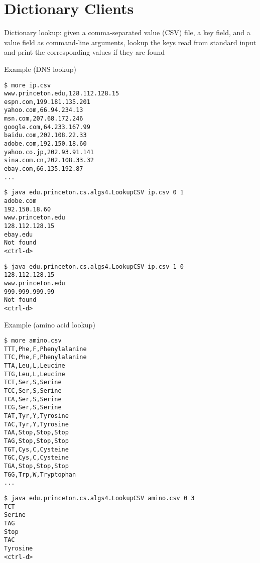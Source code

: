 \documentclass[8pt,a4paper,compress]{beamer}
\begin{document}
\section{Dictionary Clients}
\begin{frame}[fragile]
Dictionary lookup: given a comma-separated value (CSV) file, a key field, and a value field as command-line arguments, lookup the keys read from standard input and print the corresponding values if they are found

\bigskip

Example (DNS lookup)
\begin{lstlisting}[language={}]
$ more ip.csv
www.princeton.edu,128.112.128.15
espn.com,199.181.135.201
yahoo.com,66.94.234.13
msn.com,207.68.172.246
google.com,64.233.167.99
baidu.com,202.108.22.33
adobe.com,192.150.18.60
yahoo.co.jp,202.93.91.141
sina.com.cn,202.108.33.32
ebay.com,66.135.192.87
...
\end{lstlisting}
\begin{lstlisting}[language={}]
$ java edu.princeton.cs.algs4.LookupCSV ip.csv 0 1
adobe.com
192.150.18.60
www.princeton.edu
128.112.128.15
ebay.edu
Not found 
<ctrl-d>
\end{lstlisting}
\begin{lstlisting}[language={}]
$ java edu.princeton.cs.algs4.LookupCSV ip.csv 1 0
128.112.128.15
www.princeton.edu
999.999.999.99
Not found
<ctrl-d>
\end{lstlisting}
\end{frame}

\begin{frame}[fragile]
Example (amino acid lookup)
\begin{lstlisting}[language={}]
$ more amino.csv
TTT,Phe,F,Phenylalanine
TTC,Phe,F,Phenylalanine
TTA,Leu,L,Leucine
TTG,Leu,L,Leucine
TCT,Ser,S,Serine
TCC,Ser,S,Serine
TCA,Ser,S,Serine
TCG,Ser,S,Serine
TAT,Tyr,Y,Tyrosine
TAC,Tyr,Y,Tyrosine
TAA,Stop,Stop,Stop
TAG,Stop,Stop,Stop
TGT,Cys,C,Cysteine
TGC,Cys,C,Cysteine
TGA,Stop,Stop,Stop
TGG,Trp,W,Tryptophan
...
\end{lstlisting}
\begin{lstlisting}[language={}]
$ java edu.princeton.cs.algs4.LookupCSV amino.csv 0 3
TCT
Serine
TAG
Stop
TAC
Tyrosine
<ctrl-d>
\end{lstlisting}
\end{frame}
\end{document}
